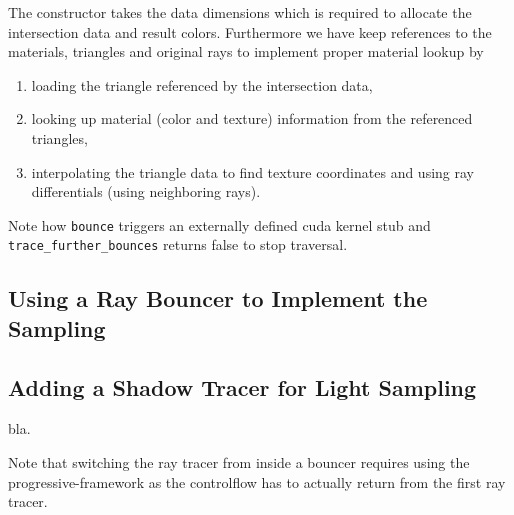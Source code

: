 \documentclass[a4paper,11pt]{scrartcl}
\begin{document}
The constructor takes the data dimensions which is required to allocate the intersection data and result colors.
Furthermore we have keep references to the materials, triangles and original rays to implement proper material lookup by
\begin{enumerate}
\item loading the triangle referenced by the intersection data,
\item looking up material (color and texture) information from the referenced triangles,
\item interpolating the triangle data to find texture coordinates and using ray differentials (using neighboring rays).
\end{enumerate}

Note how \lstinline|bounce| triggers an externally defined cuda kernel stub and \lstinline|trace_further_bounces| returns false to stop traversal.



\subsection{Using a Ray Bouncer to Implement the Sampling}

\subsection{Adding a Shadow Tracer for Light Sampling}
bla.

Note that switching the ray tracer from inside a bouncer requires using the progressive-framework 
	as the controlflow has to actually return from the first ray tracer.
\end{document}
